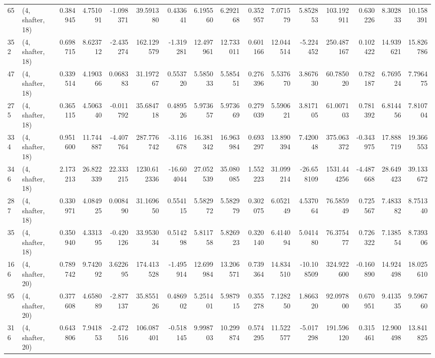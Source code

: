 \begin{tabular}{llrrrrrrrrrrrrrr}
65  &  (4, shafter, 18) &   0.384945 &   4.751091 &  -1.098371 &    39.591380 &   0.433641 &   6.195560 &   6.292168 &  0.352957 &   7.071579 &   5.852853 &   103.192911 &   0.630226 &   8.302833 &  10.158391 \\
352 &  (4, shafter, 18) &   0.698715 &   8.623712 &  -2.435274 &   162.129579 &  -1.319281 &  12.497961 &  12.733011 &  0.601166 &  12.044514 &  -5.224452 &   250.487167 &   0.102422 &  14.939621 &  15.826786 \\
47  &  (4, shafter, 18) &   0.339514 &   4.190366 &   0.068383 &    31.197267 &   0.553720 &   5.585033 &   5.585451 &  0.276396 &   5.537670 &   3.867630 &    60.785020 &   0.782187 &   6.769524 &   7.796475 \\
275 &  (4, shafter, 18) &   0.365115 &   4.506340 &  -0.011792 &    35.684718 &   0.489526 &   5.973657 &   5.973669 &  0.279039 &   5.590621 &   3.817105 &    61.007103 &   0.781392 &   6.814456 &   7.810704 \\
334 &  (4, shafter, 18) &   0.951600 &  11.744887 &  -4.407764 &   287.776742 &  -3.116678 &  16.381342 &  16.963984 &  0.693297 &  13.890394 &   7.420048 &   375.063372 &  -0.343975 &  17.888719 &  19.366553 \\
346 &  (4, shafter, 18) &   2.173213 &  26.822339 &  22.333215 &  1230.612336 & -16.604044 &  27.052539 &  35.080085 &  1.552223 &  31.099214 & -26.658109 &  1531.444256 &  -4.487668 &  28.649423 &  39.133672 \\
287 &  (4, shafter, 18) &   0.330971 &   4.084925 &   0.008490 &    31.169650 &   0.554115 &   5.582972 &   5.582979 &  0.302075 &   6.052149 &   4.537064 &    76.585949 &   0.725567 &   7.483382 &   8.751340 \\
35  &  (4, shafter, 18) &   0.350940 &   4.331395 &  -0.420126 &    33.953034 &   0.514298 &   5.811758 &   5.826923 &  0.320140 &   6.414094 &   5.041480 &    76.375477 &   0.726322 &   7.138554 &   8.739306 \\
166 &  (4, shafter, 20) &   0.789742 &   9.742092 &   3.622695 &   174.413528 &  -1.495914 &  12.699984 &  13.206571 &  0.739364 &  14.834510 & -10.108509 &   324.922600 &  -0.160890 &  14.924498 &  18.025610 \\
95  &  (4, shafter, 20) &   0.377608 &   4.658089 &  -2.877137 &    35.855126 &   0.486902 &   5.251401 &   5.987915 &  0.355278 &   7.128250 &   1.866320 &    92.097800 &   0.670951 &   9.413535 &   9.596760 \\
316 &  (4, shafter, 20) &   0.643806 &   7.941853 &  -2.472516 &   106.087401 &  -0.518145 &   9.998703 &  10.299874 &  0.574295 &  11.522577 &  -5.017298 &   191.596120 &   0.315461 &  12.900498 &  13.841825 \\

\end{tabular}
